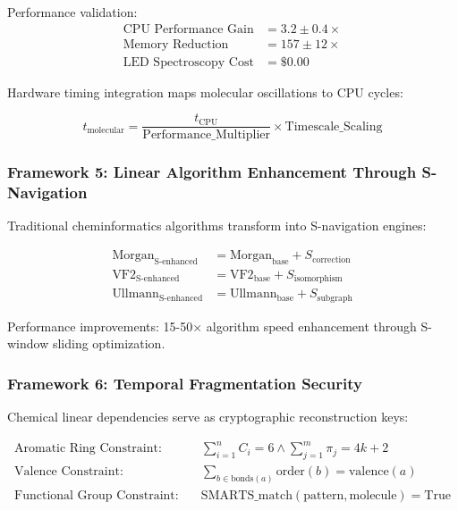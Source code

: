 \documentclass[11pt,a4paper]{article}
\begin{document}
Performance validation:
\begin{align}
\text{CPU Performance Gain} &= 3.2 \pm 0.4 \times \\
\text{Memory Reduction} &= 157 \pm 12 \times \\
\text{LED Spectroscopy Cost} &= \$0.00
\end{align}

Hardware timing integration maps molecular oscillations to CPU cycles:

\begin{equation}
t_{\text{molecular}} = \frac{t_{\text{CPU}}}{\text{Performance\_Multiplier}} \times \text{Timescale\_Scaling}
\end{equation}

\subsubsection{Framework 5: Linear Algorithm Enhancement Through S-Navigation}

Traditional cheminformatics algorithms transform into S-navigation engines:

\begin{align}
\text{Morgan}_{\text{S-enhanced}} &= \text{Morgan}_{\text{base}} + S_{\text{correction}} \\
\text{VF2}_{\text{S-enhanced}} &= \text{VF2}_{\text{base}} + S_{\text{isomorphism}} \\
\text{Ullmann}_{\text{S-enhanced}} &= \text{Ullmann}_{\text{base}} + S_{\text{subgraph}}
\end{align}

Performance improvements: 15-50× algorithm speed enhancement through S-window sliding optimization.

\subsubsection{Framework 6: Temporal Fragmentation Security}

Chemical linear dependencies serve as cryptographic reconstruction keys:

\begin{align}
\text{Aromatic Ring Constraint:} \quad &\sum_{i=1}^{n} C_i = 6 \land \sum_{j=1}^{m} \pi_j = 4k+2 \\
\text{Valence Constraint:} \quad &\sum_{b \in \text{bonds}(a)} \text{order}(b) = \text{valence}(a) \\
\text{Functional Group Constraint:} \quad &\text{SMARTS\_match}(\text{pattern}, \text{molecule}) = \text{True}
\end{align}
\end{document}
